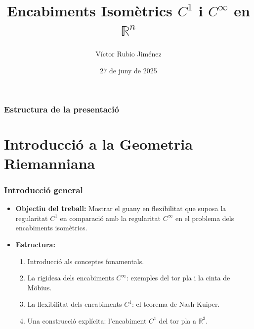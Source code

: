 \documentclass[10pt]{beamer}
\title[Encabiments Isomètrics $C^1$]{Encabiments Isomètrics $C^1$ i $C^\infty$ en $\mathbb{R}^n$}
\author{Víctor Rubio Jiménez}
\institute{Universitat de Barcelona \\ Facultat de Matemàtiques i Informàtica}
\date{27 de juny de 2025}
\begin{document}
\begin{frame}
    \titlepage
\end{frame}

\begin{frame}
    \frametitle{Estructura de la presentació}
    \tableofcontents
\end{frame}

\section{Introducció a la Geometria Riemanniana}

\begin{frame}
    \frametitle{Introducció general}
    \begin{itemize}
        \item \textbf{Objectiu del treball:} Mostrar el guany en flexibilitat que suposa la regularitat $C^1$ en comparació amb la regularitat $C^\infty$ en el problema dels encabiments isomètrics.
        \pause
        \item \textbf{Estructura:}
        \begin{enumerate}
            \item Introducció als conceptes fonamentals.
            \pause
            \item La rigidesa dels encabiments $C^\infty$: exemples del tor pla i la cinta de Möbius.
            \pause
            \item La flexibilitat dels encabiments $C^1$: el teorema de Nash-Kuiper.
            \pause
            \item Una construcció explícita: l'encabiment $C^1$ del tor pla a $\mathbb{R}^3$.
        \end{enumerate}
    \end{itemize}
\end{frame}
\end{document}
